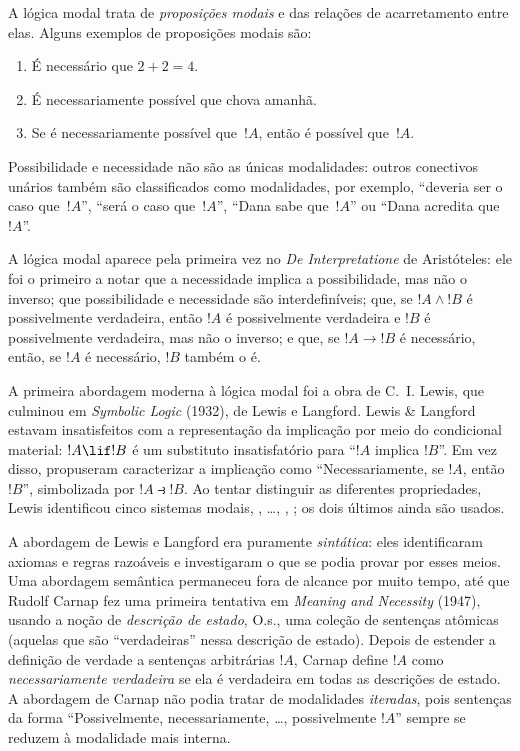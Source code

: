 \documentclass[../../../include/open-logic-section]{subfiles}
\begin{document}


A lógica modal trata de \emph{proposições modais} e das relações de
acarretamento entre elas. Alguns exemplos de proposições modais são:
\begin{enumerate}
\item É necessário que $2+2=4$.
\item É necessariamente possível que chova amanhã.
\item Se é necessariamente possível que~$!A$, então é possível
  que~$!A$.
\end{enumerate}
Possibilidade e necessidade não são as únicas modalidades: outros
conectivos unários também são classificados como modalidades, por
exemplo, ``deveria ser o caso que~$!A$'', ``será o caso que~$!A$'',
``Dana sabe que~$!A$'' ou ``Dana acredita que~$!A$''.

A lógica modal aparece pela primeira vez no \emph{De Interpretatione}
de Aristóteles: ele foi o primeiro a notar que a necessidade implica a
possibilidade, mas não o inverso; que possibilidade e necessidade são
interdefiníveis; que, se $!A \land !B$ é possivelmente verdadeira,
então $!A$ é possivelmente verdadeira e $!B$ é possivelmente verdadeira,
mas não o inverso; e que, se $!A \to !B$ é necessário, então, se $!A$
é necessário, $!B$ também o é.

A primeira abordagem moderna à lógica modal foi a obra de C.~I. Lewis,
que culminou em \emph{Symbolic Logic} (1932), de Lewis e Langford.
Lewis \& Langford estavam insatisfeitos com a representação da
implicação por meio do condicional material: $!A \lif !B$ é um
substituto insatisfatório para ``$!A$ implica $!B$''. Em vez disso,
propuseram caracterizar a implicação como ``Necessariamente, se $!A$,
então $!B$'', simbolizada por $!A \strictif !B$. Ao tentar distinguir
as diferentes propriedades, Lewis identificou cinco sistemas modais,
, \ldots, , ; os dois últimos ainda são usados.

A abordagem de Lewis e Langford era puramente \emph{sintática}: eles
identificaram axiomas e regras razoáveis e investigaram o que se podia
provar por esses meios. Uma abordagem semântica permaneceu fora de
alcance por muito tempo, até que Rudolf Carnap fez uma primeira tentativa
em \emph{Meaning and Necessity} (1947), usando a noção de \emph{descrição
  de estado}, O.s.\@, uma coleção de sentenças atômicas (aquelas que são
``verdadeiras'' nessa descrição de estado). Depois de estender a definição
de verdade a sentenças arbitrárias $!A$, Carnap define $!A$ como
\emph{necessariamente verdadeira} se ela é verdadeira em todas as
descrições de estado. A abordagem de Carnap não podia tratar de
modalidades \emph{iteradas}, pois sentenças da forma ``Possivelmente,
necessariamente, \ldots, possivelmente $!A$'' sempre se reduzem à
modalidade mais interna.
\end{document}
